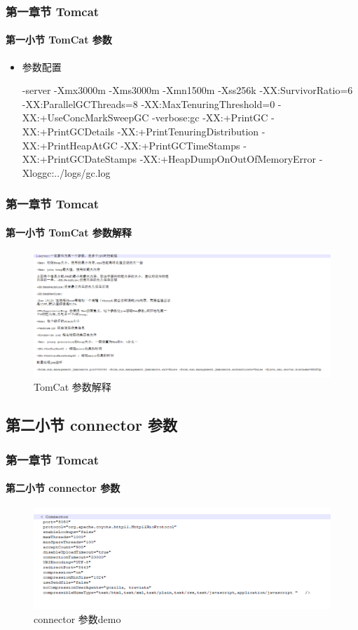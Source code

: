 \documentclass{beamer}
\begin{document}
\begin{frame}
    \frametitle{第一章节 Tomcat }
    \framesubtitle{第一小节 TomCat 参数}
     \begin{itemize}
    	\item 参数配置
    	 \small
    	 
    	 -server -Xmx3000m -Xms3000m -Xmn1500m -Xss256k -XX:SurvivorRatio=6 -XX:ParallelGCThreads=8 -XX:MaxTenuringThreshold=0 -XX:+UseConcMarkSweepGC -verbose:gc -XX:+PrintGC -XX:+PrintGCDetails -XX:+PrintTenuringDistribution -XX:+PrintHeapAtGC -XX:+PrintGCTimeStamps -XX:+PrintGCDateStamps -XX:+HeapDumpOnOutOfMemoryError -Xloggc:../logs/gc.log   	
    \end{itemize}
\end{frame}


\begin{frame}
\frametitle{第一章节 Tomcat }
\framesubtitle{第一小节 TomCat 参数解释}
\begin{figure}[ht]	
	\centering
	\includegraphics[scale=0.45]{img/shuoming.png}
	\caption{TomCat 参数解释}
	\label{fig:pathdemo1}
\end{figure}


\end{frame}



\subsection{第二小节 connector 参数 }

\begin{frame}
\frametitle{第一章节 Tomcat }
\framesubtitle{第二小节 connector 参数}
\begin{figure}[ht]	
	\centering
	\includegraphics[scale=0.48]{img/server.png}
	\caption{connector 参数demo}
	\label{fig:pathdemo1}
\end{figure}


\end{frame}
\end{document}
